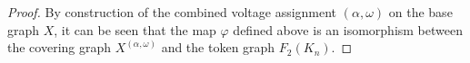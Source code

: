 \documentclass[10pt,a4paper]{amsart}
\newcommand{\G}{X}
\begin{document}
\begin{proof}
 By construction of the combined voltage assignment $(\alpha, \omega)$ on the base graph $\G$, it can be seen that the map $\varphi$ defined above is an isomorphism between the covering graph $\G^{(\alpha,\omega)}$ and the token graph $F_2(K_n)$.
\end{proof}
\end{document}
